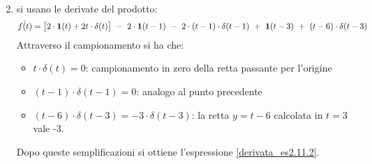 \documentclass[../main.tex]{subfiles}
\begin{document}
\begin{Exercise}[title={Derivata di una funzione definita a tratti}, difficulty=3]
\begin{enumerate}
\begin{align}
					\label{derivata_es2.11.2}
				\end{align}
			\item si usano le derivate del prodotto:
			$$ \dot{f(t)} = \big[ 2 \cdot \gr[t] + 2t \cdot \delta(t) \big]\ -\ 2 \cdot \gr[t-1]\ -\ 2 \cdot (t-1) \cdot \delta(t-1)\ +\ \gr[t-3]\ +\ (t-6) \cdot \delta(t-3) $$
			Attraverso il campionamento si ha che:
			\begin{itemize}
				\item $ t \cdot \delta(t) = 0 $: campionamento in zero della retta passante per l'origine
				\item $ (t-1) \cdot \delta(t-1) = 0$: analogo al punto precedente
				\item $ (t-6) \cdot \delta(t-3) = - 3 \cdot \delta(t-3) $: la retta $ y=t-6 $ calcolata in $ t=3 $ vale -3. 
			\end{itemize}
			Dopo queste semplificazioni si ottiene l'espressione \ref{derivata_es2.11.2}.
		\end{enumerate}
	\end{Exercise}
\end{document}
